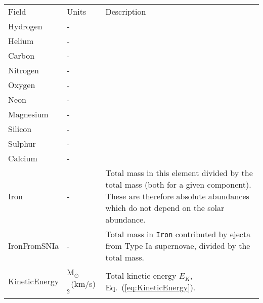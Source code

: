 \setcounter{table}{0}
\renewcommand\thetable{\Alph{section}.\arabic{table}}
\begin{table*}
\caption{ -- continued. Columns in this table exist for each of three different components:
star-forming gas ({\tt SF}), non-star-forming gas ({\tt NSF}) and
stars ({\tt Stars}). As these properties are repeated for each of these components,
we only describe them once. In the database each property will be preceded with
either {\tt [SF/NSF/Stars]\_} before its name. For instance, the metallicity
field will exist in three variants: {\tt SF\_Metallicity}, {\tt NSF\_Metallicity}
and {\tt Stars\_Metallicity} for the metallicity of the star-forming gas, of the
non star-forming gas and of the stars, respectively. Any sum used to describe a property is the sum of all particles for that component only. }
\label{table:subhalo3}
\begin{center}
\footnotesize
\renewcommand{\arraystretch}{1.5}
\begin{tabular}{ >{\ttfamily}p{4cm}p{1.5cm}p{11cm}}
{\large \bf SubHalo} & & \\
\hline
\normalfont Field & Units & Description \\
\hline\hline

Hydrogen & - & \\
Helium & - & \\
Carbon & - & \\
Nitrogen & - & \\
Oxygen & - & \\
Neon & - & \\
Magnesium & - & \\
Silicon & - & \\
Sulphur & - & \\
Calcium & - & \\
Iron & - & \multirow{-11}{11cm}{Total mass in this element divided by the total mass (both for a given component). These are therefore absolute abundances which do not depend on the solar abundance.} \\

IronFromSNIa &
- &
Total mass in {\tt Iron} contributed by ejecta from Type Ia supernovae, divided by the total mass.\\

KineticEnergy &
M$_{\odot}$~(km/s)$^{2}$ &
Total kinetic energy $E_K$, Eq.~(\ref{eq:KineticEnergy}).\\


\end{tabular}
\end{center}
\end{table*}
